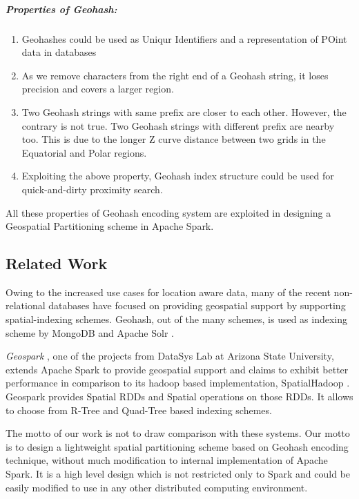 \documentclass[article,type=msc,colorback,10pt,accentcolor=tud1d]{tudthesis}
\begin{document}
		   \subparagraph{Properties of Geohash: } \cite{Geohash}
		   \begin{enumerate}
		   	\item Geohashes could be used as Uniqur Identifiers and a representation of POint data in databases \cite{wiki:geohash}
		   \item As we remove characters from the right end of a Geohash string, it loses precision and covers a larger region.
		   \item Two Geohash strings with same prefix are closer to each other. However, the contrary is not true. Two Geohash strings with different prefix are nearby too. This is due to the longer Z curve distance between two grids in the Equatorial and Polar regions.
		   		   \item Exploiting the above property, Geohash index structure could be used for quick-and-dirty proximity search.
		   
		   \end{enumerate}
		   
		    All these properties of Geohash encoding system are exploited in designing a Geospatial Partitioning scheme in Apache Spark. 
		   
		   \subsection{Related Work} 
		   
		   Owing to the increased use cases for location aware data, many of the recent non-relational databases have focused on providing geospatial support by supporting spatial-indexing schemes. Geohash, out of the many schemes,  is used as indexing scheme by 
		   MongoDB \cite{MongoDB} and Apache Solr \cite{apachesolr}. 
		   
		   \textit{Geospark }\cite{geospark}, one of the projects from DataSys Lab at Arizona State University, extends Apache Spark to provide geospatial support and claims to exhibit better performance in comparison to its hadoop based implementation, SpatialHadoop \cite{spatialhadoop}. Geospark provides Spatial RDDs and Spatial operations on those RDDs. It allows to choose from R-Tree and Quad-Tree based indexing schemes. 
		   
		   The motto of our work is not to draw comparison with these systems. Our motto is to design a lightweight spatial partitioning scheme based on Geohash encoding technique, without much modification to internal implementation of Apache Spark. It is a high level design which is not restricted only to Spark and could be easily modified to use in any other distributed computing environment. 
		   
\end{document}
